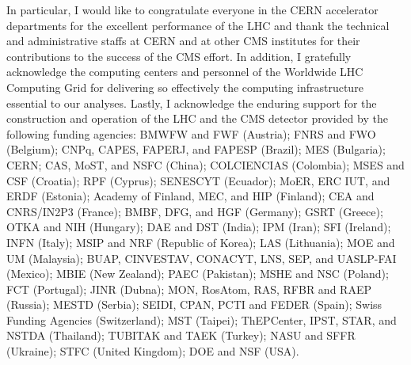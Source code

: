 \begin{frontmatter}
\begin{acknowledgements}
In particular, I would like to congratulate everyone in the CERN accelerator departments for the excellent performance of the LHC and thank the technical and administrative staffs at CERN and at other CMS institutes for their contributions to the success of the CMS effort. In addition, I gratefully acknowledge the computing centers and personnel of the Worldwide LHC Computing Grid for delivering so effectively the computing infrastructure essential to our analyses. Lastly, I acknowledge the enduring support for the construction and operation of the LHC and the CMS detector provided by the following funding agencies: BMWFW and FWF (Austria); FNRS and FWO (Belgium); CNPq, CAPES, FAPERJ, and FAPESP (Brazil); MES (Bulgaria); CERN; CAS, MoST, and NSFC (China); COLCIENCIAS (Colombia); MSES and CSF (Croatia); RPF (Cyprus); SENESCYT (Ecuador); MoER, ERC IUT, and ERDF (Estonia); Academy of Finland, MEC, and HIP (Finland); CEA and CNRS/IN2P3 (France); BMBF, DFG, and HGF (Germany); GSRT (Greece); OTKA and NIH (Hungary); DAE and DST (India); IPM (Iran); SFI (Ireland); INFN (Italy); MSIP and NRF (Republic of Korea); LAS (Lithuania); MOE and UM (Malaysia); BUAP, CINVESTAV, CONACYT, LNS, SEP, and UASLP-FAI (Mexico); MBIE (New Zealand); PAEC (Pakistan); MSHE and NSC (Poland); FCT (Portugal); JINR (Dubna); MON, RosAtom, RAS, RFBR and RAEP (Russia); MESTD (Serbia); SEIDI, CPAN, PCTI and FEDER (Spain); Swiss Funding Agencies (Switzerland); MST (Taipei); ThEPCenter, IPST, STAR, and NSTDA (Thailand); TUBITAK and TAEK (Turkey); NASU and SFFR (Ukraine); STFC (United Kingdom); DOE and NSF (USA).

\end{acknowledgements}                                                         


\end{frontmatter}
